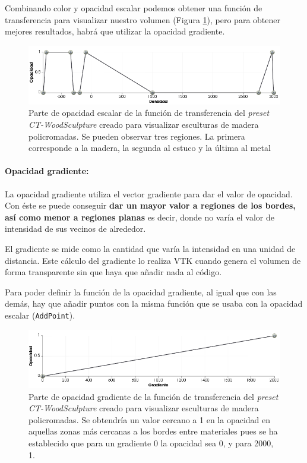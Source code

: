 Combinando color y opacidad escalar podemos obtener una función de transferencia para visualizar nuestro volumen (Figura \ref{fig:opacity_tf}), pero para obtener mejores resultados, habrá que utilizar la opacidad gradiente. 

\begin{figure}[H]
	\centering
	\includegraphics[width=12.5cm]{imagenes/opacity_tf}
	\caption{Parte de opacidad escalar de la función de transferencia del \textit{preset} \textit{CT-WoodSculpture} creado para visualizar esculturas de madera policromadas. Se pueden observar tres regiones. La primera corresponde a la madera, la segunda al estuco y la última al metal}
	\label{fig:opacity_tf}
\end{figure}

\paragraph{\textbf{Opacidad gradiente:}} La opacidad gradiente utiliza el vector gradiente para dar el valor de opacidad. Con éste se puede conseguir \textbf{dar un mayor valor a regiones de los bordes, así como menor a regiones planas} es decir, donde no varía el valor de intensidad de sus vecinos de alrededor.

El gradiente se mide como la cantidad que varía la intensidad en una unidad de distancia. Este cálculo del gradiente lo realiza VTK cuando genera el volumen de forma transparente sin que haya que añadir nada al código.

Para poder definir la función de la opacidad gradiente, al igual que con las demás, hay que añadir puntos con la misma función que se usaba con la opacidad escalar (\texttt{AddPoint}). 

\begin{figure}[H]
	\centering
	\includegraphics[width=12.5cm]{imagenes/gradient_tf}
	\caption{Parte de opacidad gradiente de la función de transferencia del \textit{preset} \textit{CT-WoodSculpture} creado para visualizar esculturas de madera policromadas. Se obtendría un valor cercano a 1 en la opacidad en aquellas zonas más cercanas a los bordes entre materiales pues se ha establecido que para un gradiente 0 la opacidad sea 0, y para 2000, 1. }
	\label{fig:gradient_tf}
\end{figure}

